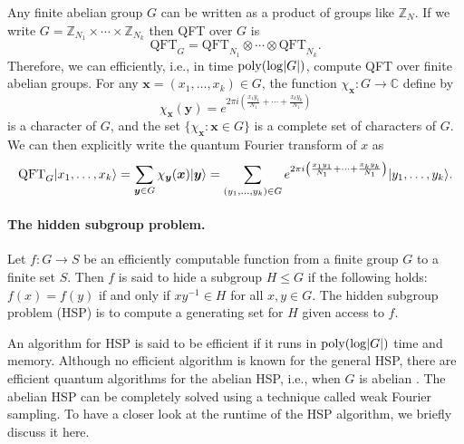 \documentclass[11pt]{article}
\theoremstyle{plain}
\theoremstyle{definition}
\DeclareMathOperator{\poly}{poly}
\DeclarePairedDelimiter{\abs}{\lvert}{\rvert}
\DeclarePairedDelimiter{\ket}{\lvert}{\rangle}
\def\C{\mathbb{C}}
\def\Z{\mathbb{Z}}
\begin{document}
Any finite abelian group $G$ can be written as a product of groups like $\Z_N$. If we write $G = \Z_{N_1} \times \cdots \times \Z_{N_k}$ then QFT over $G$ is
\[ \mathrm{QFT}_G = \mathrm{QFT}_{N_1} \otimes \cdots \otimes \mathrm{QFT}_{N_k}.  \]
Therefore, we can efficiently, i.e., in time $\poly(\log \abs{G})$, compute QFT over finite abelian groups. For 
any $\bm{x} = (x_1, \dots, x_k) \in G$, the function $\chi_{\bm{x}}: G \rightarrow \C$ define by
\begin{equation}
\label{equ:char}
	\chi_{\bm{x}}(\bm{y}) = e^{2\pi i \left( \frac{x_1y_1}{N_1} + \cdots + \frac{x_ky_k}{N_1} 
	\right)}
\end{equation}
is a character of $G$, and the set $\{ \chi_{\bm{x}}: \bm{x} \in G \}$ is a complete set of 
characters of $G$. We can then explicitly write the quantum Fourier transform of $x$ as
\[ \mathrm{QFT}_G \ket{x_1, \dots, x_k} = \sum_{\bm{y} \in G} \chi_{\bm{y}}(\bm{x}) \ket{\bm{y}} = 
\sum_{(y_1, \dots, y_k) \in G} e^{2\pi i \left( \frac{x_1y_1}{N_1} + \cdots + \frac{x_ky_k}{N_1} 
\right)} \ket{y_1, \dots, y_k}. \]

\paragraph{The hidden subgroup problem.}
Let $f: G \rightarrow S$ be an efficiently computable function from a finite group $G$ to a finite 
set $S$. Then $f$ is said to hide a subgroup $H \le G$ if the following holds: $f(x) = f(y)$ if and 
only if $xy^{-1} \in H$ for all $x, y \in G$. The hidden subgroup problem (HSP) is to compute a 
generating set for $H$ given access to $f$.

An algorithm for HSP is said to be efficient if it runs in $\poly(\log \abs{G})$ time and memory. 
Although no efficient algorithm is known for the general HSP, there are efficient quantum algorithms 
for the abelian HSP, i.e., when $G$ is abelian \cite{hallgren2003hidden, kaye2007introduction}. The abelian HSP can be completely solved using a 
technique called weak Fourier sampling. To have a closer look at the runtime of the HSP algorithm, 
we briefly discuss it here.
\end{document}
